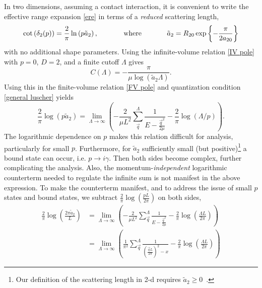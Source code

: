 In two dimensions, assuming a contact interaction, it is convenient to write the effective range expansion \eqref{ere} in terms of a \emph{reduced} scattering length,
\begin{equation}\label{eq:2d contact phase shift}
    \cot \left(\delta_{2}(p)\right)
    =
    \frac{2}{\pi} \ln \left(p \tilde a_{2}\right),
%
    \hspace{0.5in}
    \text{where}
    \hspace{0.5in}
%
    \tilde a_{2}
    =
    R_{20}\exp\left\{-\frac{\pi}{2 a_{20}}\right\}
\end{equation}
with no additional shape parameters.
Using the infinite-volume relation \eqref{IV pole} with $p=0$, $D=2$, and a finite cutoff $\Lambda$ gives
\begin{equation}\label{eq:C2}
    C(\Lambda)
    =
    -\frac{\pi}{\mu \log \left(\tilde a_{2} \Lambda\right)}.
\end{equation}
Using this in the finite-volume relation \eqref{FV pole} and quantization condition \eqref{general luscher} yields
\begin{equation}\label{eq:first 2d}
    \frac{2}{\pi} \log \left(p\tilde a_{2}\right)
    =
    \lim_{\Lambda\to\infty}
    \left(
        -\frac{2}{\mu L^{2}} \sum_{\vec{q}}^{\Lambda} \frac{1}{E-\frac{\vec{q}^{2}}{2\mu}}
        -\frac{2}{\pi} \log (\Lambda / p)
    \right).
\end{equation}
The logarithmic dependence on $p$ makes this relation difficult for analysis, particularly for small $p$.
Furthermore, for $\tilde a_{2}$ sufficiently small (but positive)\footnote{
    Our definition of the scattering length in 2-d requires $\tilde a_{2}\ge 0$~\cite{Pupyshev:2014}.
} a bound state can occur, i.e. $p\to i\gamma$.
Then both sides become complex, further complicating the analysis.
Also, the momentum-\emph{independent} logarithmic counterterm needed to regulate the infinite sum is not manifest in the above expression.
To make the counterterm manifest, and to address the issue of small $p$ states and bound states, we subtract $\frac{2}{\pi}\log\left(\frac{pL}{2\pi}\right)$ on both sides,
\begin{align}
    \frac{2}{\pi} \log \left(\frac{2\pi \tilde a_{2}}{L}\right)
    &=
    \lim_{\Lambda\to\infty}
    \left(
        -\frac{2}{\mu L^{2}} \sum_{\vec{q}}^{\Lambda} \frac{1}{E-\frac{\vec{q}^{2}}{2\mu}}
        -\frac{2}{\pi} \log \left(\frac{\Lambda L}{2\pi}\right)
    \right)
    \nonumber\\
    &=
    \lim_{\Lambda\to\infty}
    \left(
        \frac{1}{\pi^2} \sum_{\vec{q}}^{\Lambda} \frac{1}{\left(\frac{\vec{q}L}{2\pi}\right)^2-x}-\frac{2}{\pi} \log \left(\frac{\Lambda L}{2\pi}\right)
    \right)
    \label{eq:second 2d}
\end{align}
